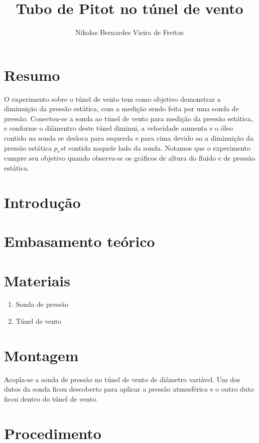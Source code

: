 \documentclass[a4paper]{article}
\title{Tubo de Pitot no túnel de vento}
\author{Nikolas Bernardes Vieira de Freitas}
\begin{document}
\maketitle

\section{Resumo}
    O experimento sobre o túnel de vento tem como objetivo demonstrar a diminuição da pressão estática, com a medição sendo feita por uma sonda de pressão. Conectou-se a sonda ao túnel de vento para medição da pressão estática, e conforme o diâmentro deste túnel diminui, a velocidade aumenta e o óleo contido na sonda se desloca para esquerda e para cima devido ao a diminuição da pressão estática $p_est$ contida naquele lado da sonda. Notamos que o experimento cumpre seu objetivo quando observa-se os gráficos de altura do fluído e de pressão estática.

\section{Introdução}

\section{Embasamento teórico}

\section{Materiais}
    \begin{enumerate}[label=(\roman*)]
        \item Sonda de pressão
        \item Túnel de vento
    \end{enumerate}

\section{Montagem}
    Acopla-se a sonda de pressão no túnel de vento de diâmetro variável. Um dos dutos da sonda ficou descoberto para aplicar a pressão atmosférica e o outro duto ficou dentro do túnel de vento.

\section{Procedimento}
\end{document}

